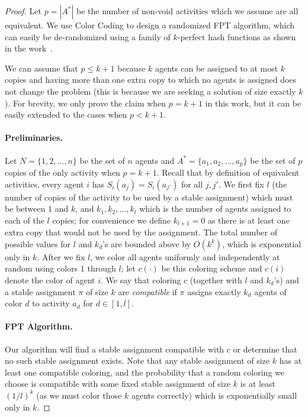 \begin{proof}
Let $p = |A^*|$ be the number of non-void activities which we assume are all equivalent.
We use Color Coding to design a randomized FPT algorithm, which can easily be de-randomized using a family of $k$-perfect hash functions as shown in the work~\cite{ColorCoding}. 

We can assume that $p \leq k+1$ because $k$ agents can be assigned to at most $k$ copies and having more than one extra copy to which no agents is assigned does not change the problem (this is because we are seeking a solution of size exactly $k$). For brevity, we only prove the claim when $p = k+1$ in this work, but it can be easily extended to the cases when $p < k+1$. 

\paragraph{Preliminaries.}
Let $N = \{1, 2, \dots, n\}$ be the set of $n$ agents and $A^* = \{a_1, a_2, \dots, a_p\}$ be the set of $p$ copies of the only activity when $p = k+1$. Recall that by definition of equivalent activities, every agent $i$ has $S_i(a_j) = S_i(a_{j'})$ for all $j,j'$.
We first fix $l$ (the number of copies of the activity to be used by a stable assignment) which must be between $1$ and $k$, and $k_1, k_2, \dots, k_l$ which is the number of agents assigned to each of the $l$ copies; for convenience we define $k_{l+1} = 0$ as there is at least one extra copy that would not be used by the assignment.
The total number of possible values for $l$ and $k_d$'s are bounded above by $O(k^k)$, which is exponential only in $k$.
After we fix $l$, we color all agents uniformly and independently at random using colors $1$ through $l$; let $c(\cdot)$ be this coloring scheme and $c(i)$ denote the color of agent $i$. 
We say that coloring $c$ (together with $l$ and $k_d$'s) and a stable assignment $\pi$ of size $k$ are {\em compatible} if $\pi$ assigns exactly $k_d$ agents of color $d$ to activity $a_d$ for $d\in [1, l]$.

\paragraph{FPT Algorithm.}
Our algorithm will find a stable assignment compatible with $c$ or determine that no such stable assignment exists. 
Note that any stable assignment of size $k$ has at least one compatible coloring, and the probability that a random coloring we choose is compatible with some fixed stable assignment of size $k$ is at least $(1/l)^k$ (as we must color those $k$ agents correctly) which is exponentially small only in $k$. 


\end{proof}

